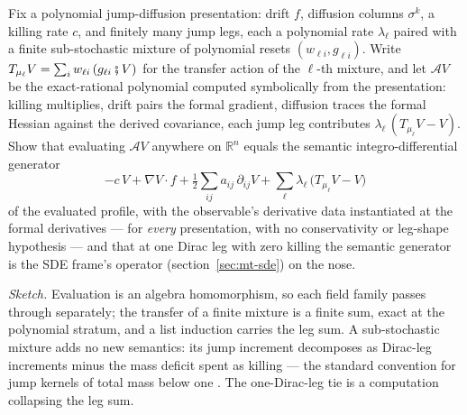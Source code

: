 \begin{problem}
\label{prob:mt-jumpdiff}
Fix a polynomial jump-diffusion presentation: drift
$f$, diffusion columns $\sigma^k$, a killing rate $c$, and finitely
many jump legs, each a polynomial rate $\lambda_\ell$ paired with a
finite sub-stochastic mixture of polynomial resets
$(w_{\ell i}, g_{\ell i})$. Write $T_{\mu_\ell} V = \sum_i
w_{\ell i}\,(g_{\ell i} \fatsemi V)$ for the transfer action of the
$\ell$-th mixture, and let $\mathcal{A}V$ be the exact-rational
polynomial computed symbolically from the presentation: killing
multiplies, drift pairs the formal gradient, diffusion traces the
formal Hessian against the derived covariance, each jump leg
contributes $\lambda_\ell\,(T_{\mu_\ell}V - V)$. Show that evaluating
$\mathcal{A}V$ anywhere on $\mathbb{R}^n$ equals the semantic
integro-differential generator
\[
  -c\,V + \nabla V \cdot f
  + \tfrac12 \textstyle\sum_{ij} a_{ij}\,\partial_{ij}V
  + \textstyle\sum_\ell \lambda_\ell\,\big(T_{\mu_\ell}V - V\big)
\]
of the evaluated profile, with the observable's derivative data
instantiated at the formal derivatives --- for \emph{every}
presentation, with no conservativity or leg-shape hypothesis --- and
that at one Dirac leg with zero killing the semantic generator is the
SDE frame's operator (section~\ref{sec:mt-sde}) on the nose.
\end{problem}

\emph{Sketch.} Evaluation is an algebra homomorphism, so each field
family passes through separately; the transfer of a finite mixture is
a finite sum, exact at the polynomial stratum, and a list induction
carries the leg sum. A sub-stochastic mixture adds no new semantics:
its jump increment decomposes as Dirac-leg increments minus the mass
deficit spent as killing --- the standard convention for jump kernels
of total mass below one \cite{davis-1993}. The one-Dirac-leg tie is a
computation collapsing the leg sum.

